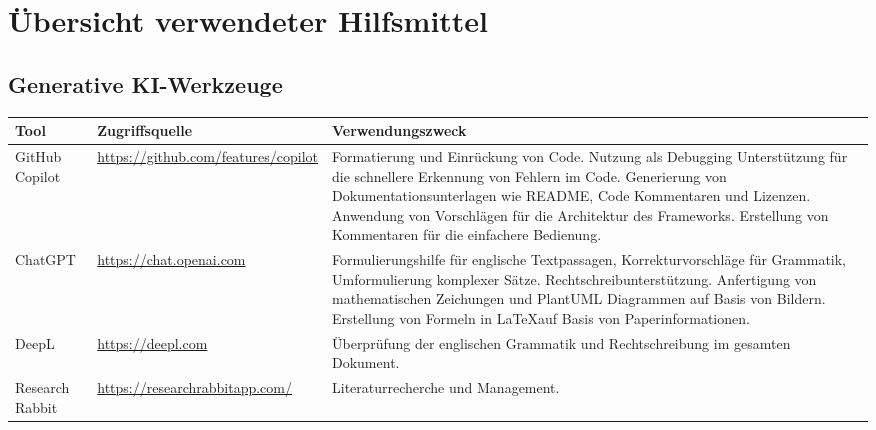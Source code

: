 \chapter*{Übersicht verwendeter Hilfsmittel}
\thispagestyle{plain}

\section*{Generative KI-Werkzeuge}

\begin{tabular}{p{3cm}p{5cm}p{7cm}}
  \textbf{Tool}   & \textbf{Zugriffsquelle}                   & \textbf{Verwendungszweck}                                                                                                                                                                                                                                                \\
  \hline
  GitHub Copilot  & \url{https://github.com/features/copilot} &
  Formatierung und Einrückung von Code. Nutzung als Debugging Unterstützung für die schnellere Erkennung von Fehlern im Code. Generierung von Dokumentationsunterlagen wie README, Code Kommentaren und Lizenzen. Anwendung von Vorschlägen für die Architektur des Frameworks. Erstellung von Kommentaren für die einfachere Bedienung. \\
  \hline
  ChatGPT         & \url{https://chat.openai.com}             &
  Formulierungshilfe für englische Textpassagen, Korrekturvorschläge für Grammatik, Umformulierung komplexer Sätze. Rechtschreibunterstützung. Anfertigung von mathematischen Zeichungen und PlantUML Diagrammen auf Basis von Bildern. Erstellung von Formeln in \LaTeX auf Basis von Paperinformationen.                               \\
  \hline
  DeepL           & \url{https://deepl.com}                   &
  Überprüfung der englischen Grammatik und Rechtschreibung im gesamten Dokument.                                                                                                                                                                                                                                                         \\
  \hline
  Research Rabbit & \url{https://researchrabbitapp.com/}      &
  Literaturrecherche und Management.                                                                                                                                                                                                                                                                                                     \\
  \hline
\end{tabular}

